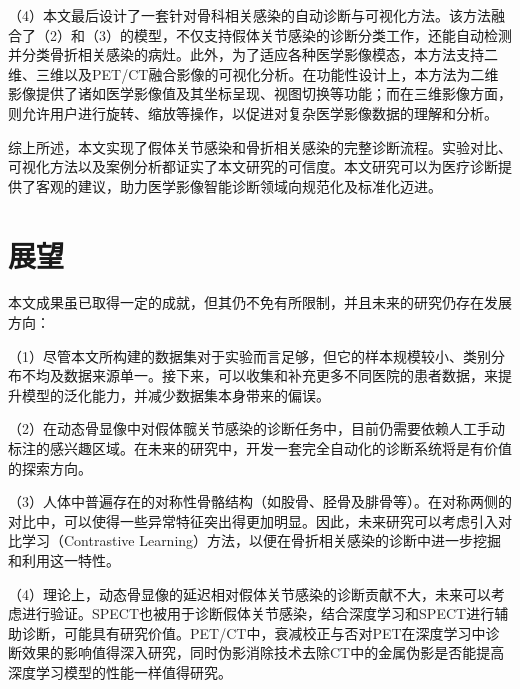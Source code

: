 （4）本文最后设计了一套针对骨科相关感染的自动诊断与可视化方法。该方法融合了（2）和（3）的模型，不仅支持假体关节感染的诊断分类工作，还能自动检测并分类骨折相关感染的病灶。此外，为了适应各种医学影像模态，本方法支持二维、三维以及PET/CT融合影像的可视化分析。在功能性设计上，本方法为二维影像提供了诸如医学影像值及其坐标呈现、视图切换等功能；而在三维影像方面，则允许用户进行旋转、缩放等操作，以促进对复杂医学影像数据的理解和分析。

综上所述，本文实现了假体关节感染和骨折相关感染的完整诊断流程。实验对比、可视化方法以及案例分析都证实了本文研究的可信度。本文研究可以为医疗诊断提供了客观的建议，助力医学影像智能诊断领域向规范化及标准化迈进。

\section{展望}

本文成果虽已取得一定的成就，但其仍不免有所限制，并且未来的研究仍存在发展方向：

（1）尽管本文所构建的数据集对于实验而言足够，但它的样本规模较小、类别分布不均及数据来源单一。接下来，可以收集和补充更多不同医院的患者数据，来提升模型的泛化能力，并减少数据集本身带来的偏误。

（2）在动态骨显像中对假体髋关节感染的诊断任务中，目前仍需要依赖人工手动标注的感兴趣区域。在未来的研究中，开发一套完全自动化的诊断系统将是有价值的探索方向。

（3）人体中普遍存在的对称性骨骼结构（如股骨、胫骨及腓骨等）。在对称两侧的对比中，可以使得一些异常特征突出得更加明显。因此，未来研究可以考虑引入对比学习（Contrastive Learning）方法，以便在骨折相关感染的诊断中进一步挖掘和利用这一特性。

（4）理论上，动态骨显像的延迟相对假体关节感染的诊断贡献不大，未来可以考虑进行验证。SPECT也被用于诊断假体关节感染，结合深度学习和SPECT进行辅助诊断，可能具有研究价值。PET/CT中，衰减校正与否对PET在深度学习中诊断效果的影响值得深入研究，同时伪影消除技术去除CT中的金属伪影是否能提高深度学习模型的性能一样值得研究。